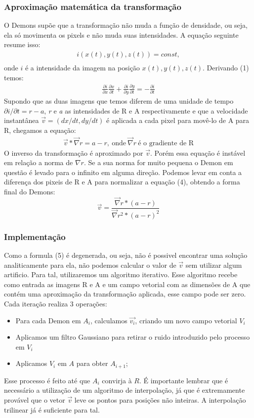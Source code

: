 \documentclass[]{spie}  %
\begin{document}
\subsubsection{Aproximação matemática da transformação}
	O Demons supõe que a transformação não muda a função de densidade, ou seja, ela só movimenta os pixels e não muda
suas intensidades. A equação seguinte resume isso:
\begin{align}
	i(x(t),y(t),z(t)) = const, \\
\end{align}
	onde $i$ é a intensidade da imagem na posição $x(t),y(t),z(t)$. Derivando (1) temos:
\begin{align}
	\frac{\partial i}{\partial x} \frac{\partial x}{\partial t} +
	\frac{\partial i}{\partial y} \frac{\partial y}{\partial t} = - \frac{\partial i}{\partial t}
\end{align}
	Supondo que as duas imagens que temos diferem de uma unidade de tempo $\partial i/\partial t = 
r-a$, \textit{r} e \textit{a} as intensidades de R e A respectivamente e que a velocidade instantânea $\vec{v} = (dx/dt,dy/dt)$ é aplicada a cada pixel para movê-lo de A para R, 
chegamos a equação:
\begin{align}
	\vec{v}*\vec{\nabla}r = a - r, \ \text{onde} \ \vec{\nabla} r \ \text{é o gradiente de R}
\end{align}
	O inverso da transformação é aproximado por $\vec{v}$. Porém essa equação é instável em relação a norma de $\nabla 
r$. Se a sua norma for muito pequena o Demon em questão é levado para o infinito em alguma direção. Podemos levar em 
conta a diferença dos pixeis de R e A para normalizar a equação (4), obtendo a forma final do Demons:
\begin{equation}
	\vec{v} = \frac{\vec{\nabla}r * (a - r)}{\vec{\nabla}r^2 * (a - r)^2}
\end{equation}

\subsubsection{Implementação}
	Como a formula (5) é degenerada, ou seja, não é possivel encontrar uma solução analiticamente para ela,
não podemos calcular o valor de $\vec{v}$ sem utilizar algum artificio. Para tal,
utilizaremos um algoritmo iterativo. Esse algoritmo recebe como entrada as imagens R e A e um campo vetorial
com as dimensões de A que contém uma aproximação da transformação aplicada, esse campo pode ser zero. 
Cada iteração realiza 3 operações:
\begin{itemize}
	\item Para cada Demon em $A_i$, calculamos $\vec{v_i}$, criando um novo campo vetorial $V_i$
	\item Aplicamos um filtro Gaussiano para retirar o ruido introduzido pelo processo em $V_i$
	\item Aplicamos $V_i$ em $A$ para obter $A_{i+1}$;
\end{itemize}
	Esse processo é feito até que $A_i$ convirja à $R$. É importante lembrar que é necessário a
utilização de um algoritmo de interpolação, já que é extremamente provável que o vetor $\vec{v}$
leve os pontos para posições não inteiras. A interpolação trilinear já é suficiente para tal.
\end{document}
